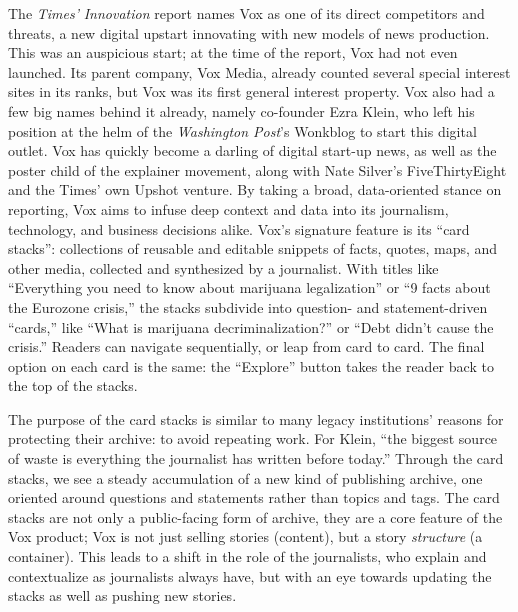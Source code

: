 The \emph{Times'} \emph{Innovation} report names Vox as one of its direct competitors and threats, a new digital upstart innovating with new models of news production. This was an auspicious start; at the time of the report, Vox had not even launched. Its parent company, Vox Media, already counted several special interest sites in its ranks, but Vox was its first general interest property. Vox also had a few big names behind it already, namely co-founder Ezra Klein, who left his position at the helm of the \emph{Washington Post}'s Wonkblog to start this digital outlet. Vox has quickly become a darling of digital start-up news, as well as the poster child of the explainer movement, along with Nate Silver's FiveThirtyEight and the Times' own Upshot venture. By taking a broad, data-oriented stance on reporting, Vox aims to infuse deep context and data into its journalism, technology, and business decisions alike. Vox's signature feature is its ``card stacks'': collections of reusable and editable snippets of facts, quotes, maps, and other media, collected and synthesized by a journalist. With titles like ``Everything you need to know about marijuana legalization'' or ``9 facts about the Eurozone crisis,'' the stacks subdivide into question- and statement-driven ``cards,'' like ``What is marijuana decriminalization?'' or ``Debt didn't cause the crisis.'' Readers can navigate sequentially, or leap from card to card. The final option on each card is the same: the ``Explore'' button takes the reader back to the top of the stacks.

The purpose of the card stacks is similar to many legacy institutions' reasons for protecting their archive: to avoid repeating work. For Klein, ``the biggest source of waste is everything the journalist has written before today.''\autocite{kaufman_vox_2014} Through the card stacks, we see a steady accumulation of a new kind of publishing archive, one oriented around questions and statements rather than topics and tags. The card stacks are not only a public-facing form of archive, they are a core feature of the Vox product; Vox is not just selling stories (content), but a story \emph{structure} (a container). This leads to a shift in the role of the journalists, who explain and contextualize as journalists always have, but with an eye towards updating the stacks as well as pushing new stories.


